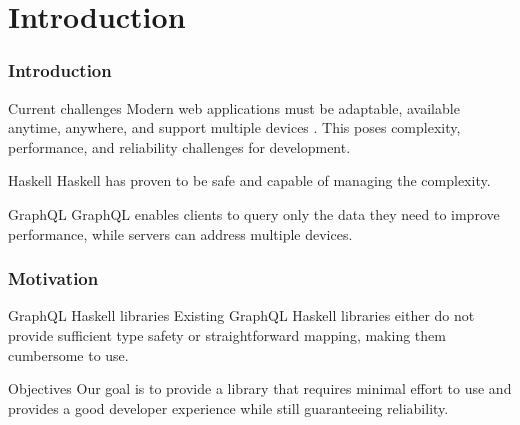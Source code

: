 \section{Introduction}

\begin{frame}\frametitle{Introduction}

    \begin{block}{Current challenges}
        Modern web applications must be adaptable, available anytime, anywhere, and support multiple devices \cite{char-of-modern-web-app}. This poses complexity, performance, and reliability challenges for development.  
    \end{block}

    \begin{block}{Haskell} Haskell has proven to be safe and capable of managing the complexity. 
    \end{block}

    \begin{block}{GraphQL} GraphQL enables clients to query only the data they need to improve performance, while servers can address multiple devices.
    \end{block}

\end{frame}

\begin{frame}\frametitle{Motivation}

\begin{block}{GraphQL Haskell libraries}
    Existing GraphQL Haskell libraries either do not provide sufficient type safety or straightforward mapping, making them cumbersome to use.
\end{block}

\begin{block}{Objectives}
Our goal is to provide a library that requires minimal effort to use and provides a good developer experience while still guaranteeing reliability.
\end{block}

\end{frame}
